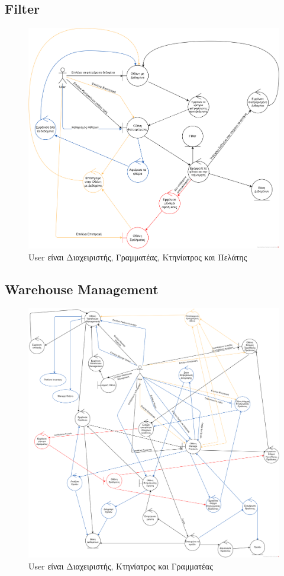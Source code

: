 \documentclass[12pt,a4paper,twoside]{book}
\begin{document}
\subsection{Filter}
\begin{figure}[H]
    \centering
    \includegraphics[width=\textwidth]{Resources/Robustness Diagram/Filter_RD.png}
    \caption{User είναι Διαχειριστής, Γραμματέας, Κτηνίατρος και Πελάτης}\label{fig:robustness-filter}
\end{figure}

\subsection{Warehouse Management}
\begin{figure}[H]
    \centering
    \includegraphics[width=\textwidth]{Resources/Robustness Diagram/Warehouse_Management_RD.png}
    \caption{User είναι Διαχειριστής, Κτηνίατρος και Γραμματέας}\label{fig:robustness-warehouse-management}
\end{figure}
\end{document}
